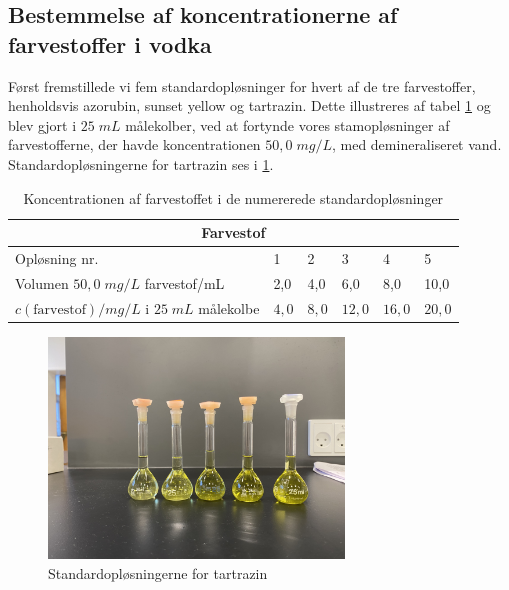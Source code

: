 \documentclass[11pt]{article}
\theoremstyle{definition}
\begin{document}
\subsection{Bestemmelse af koncentrationerne af farvestoffer i vodka}
Først fremstillede vi fem standardopløsninger for hvert af de tre farvestoffer, henholdsvis azorubin, sunset yellow og tartrazin.
Dette illustreres af tabel \ref{tab:kon} og blev gjort i $25 \;\unit{mL}  $ målekolber, ved at fortynde vores stamopløsninger af farvestofferne, der havde koncentrationen $50,0 \;\unit{mg/L} $, med demineraliseret vand.
Standardopløsningerne for tartrazin ses i \cref{fig:stand}.
\begin{table}[H]
\centering
\begin{tabular}{@{}llllll@{}}
\toprule
\multicolumn{6}{c}{Farvestof}                                                                          \\ \midrule
Opløsning nr.                                               & 1     & 2     & 3      & 4      & 5      \\
  Volumen $50,0 \;\unit{mg/L} $ farvestof/\unit{mL} & 2,0 & 4,0 & 6,0 & 8,0 & 10,0 \\ 
$c(\text{farvestof})/\unit{mg/L}$ i $25\;\unit{mL}$ målekolbe & $4,0$ & $8,0$ & $12,0$ & $16,0$ & $20,0$ \\ \bottomrule
\end{tabular}
  \caption{Koncentrationen af farvestoffet i de numererede standardopløsninger}
  \label{tab:kon}
\end{table}
\begin{figure}[H]
\begin{center}
  \includegraphics[width=0.7\textwidth]{standard.jpg}
\end{center}
\caption{Standardopløsningerne for tartrazin}
\label{fig:stand}
\end{figure}
\end{document}
